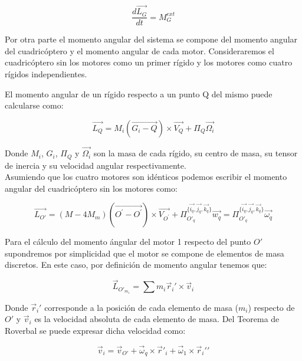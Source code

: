 \documentclass[main]{subfiles}
\begin{document}
\begin{equation}
\frac{d\vec{L_G}}{dt} =M_G^{ext}
\end{equation}



Por otra parte el momento angular del sistema se compone del momento angular del cuadric\'optero y el momento angular de cada motor. Consideraremos el cuadric\'optero sin los motores como un primer r\'igido y los motores como cuatro r\'igidos independientes.

El momento angular de un r\'igido respecto a un punto Q del mismo puede calcularse como:

\begin{equation}
\vec{L_Q} = M_i(\vec{G_i-Q})\times\vec{V_Q}+\Pi_{Q}\vec{\Omega_i}
\end{equation}

Donde $M_i$, $G_i$, $\Pi_{Q}$ y $\vec{\Omega_i}$ son la masa de cada r\'igido, su centro de masa, su tensor de inercia y su velocidad angular respectivamente.\\

Asumiendo que los cuatro motores son id\'enticos podemos escribir el momento angular del cuadric\'optero sin los motores como:

\begin{equation}
\vec{L_{O\prime}} = (M-4 M_m)(\vec{O^\prime-O^\prime})\times\vec{V_{O^\prime}}+\Pi_{O\prime_q}^{\{\vec{i_q}, \vec{j_q}, \vec{k_q}\}}\vec{w_q}=\Pi_{O\prime_q}^{\{\vec{i_q}, \vec{j_q}, \vec{k_q}\}}\vec{\omega_q}
\end{equation}

Para el c\'alculo del momento \'angular del motor 1 respecto del punto $O\prime$ supondremos por simplicidad que el motor se compone de elementos de masa discretos. En este caso, por definici\'on de momento angular tenemos que:

\begin{equation}
\vec{L}_{O\prime_{m_1}} = \sum m_i\vec{r}_i\prime \times \vec{v}_i
\end{equation}

Donde $\vec{r}_i\prime$ corresponde a la posici\'on de cada elemento de masa ($m_i$) respecto de $O\prime$ y $\vec{v}_i$ es la velocidad absoluta de cada elemento de masa. Del Teorema de Roverbal se puede expresar dicha velocidad como:

\begin{equation}
\vec{v}_i = \vec{v}_{O\prime} + \vec{\omega}_q \times \vec{r}\prime_i + \vec{\omega}_1 \times \vec{r}_i\prime\prime
\end{equation}
\end{document}
